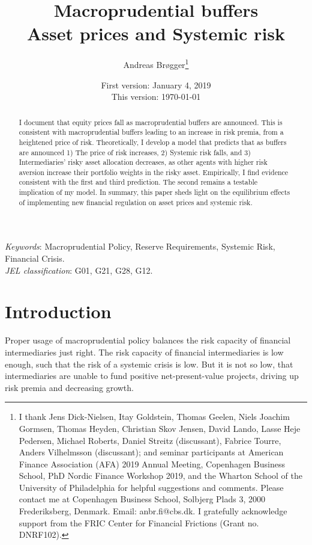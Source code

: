\documentclass[11pt]{article}
\title{\Huge Macroprudential buffers\\ \huge{Asset prices and Systemic risk}}
\author{\Large Andreas Br\o gger\thanks{
\small
I thank Jens Dick-Nielsen, Itay Goldstein, Thomas Geelen, Niels Joachim Gormsen, Thomas Heyden, Christian Skov Jensen, David Lando, Lasse Heje Pedersen, Michael Roberts, Daniel Streitz (discussant), Fabrice Tourre, Anders Vilhelmsson (discussant); and seminar participants at American Finance Association (AFA) 2019 Annual Meeting, Copenhagen Business School, PhD Nordic Finance Workshop 2019, and the Wharton School of the University of Philadelphia for helpful suggestions and comments. Please contact me at Copenhagen Business School, Solbjerg Plads 3, 2000 Frederiksberg, Denmark.
Email: anbr.fi@cbs.dk.
I gratefully acknowledge support from the FRIC Center for Financial Frictions (Grant no. DNRF102).}
}
\date{\Large First version: January 4, 2019\\This version: \today
}
\begin{document}
\maketitle

\begin{abstract}
\noindent I document that equity prices fall as macroprudential buffers are announced. This is consistent with macroprudential buffers leading to an increase in risk premia, from a heightened price of risk. Theoretically, I develop a model that predicts that as buffers are announced 1) The price of risk increases, 2) Systemic risk falls, and 3) Intermediaries' risky asset allocation decreases, as other agents with higher risk aversion increase their portfolio weights in the risky asset. Empirically, I find evidence consistent with the first and third prediction. The second remains a testable implication of my model. In summary, this paper sheds light on the equilibrium effects of implementing new financial regulation on asset prices and systemic risk.
\end{abstract}

\noindent \textit{Keywords}: Macroprudential Policy, Reserve Requirements, Systemic Risk, Financial Crisis.\\
\noindent \textit{JEL classification}: G01, G21, G28, G12.

\clearpage
\renewcommand{\thefootnote}{\arabic{footnote}}


\section*{Introduction}
Proper usage of macroprudential policy balances the risk capacity of financial intermediaries just right. The risk capacity of financial intermediaries is low enough, such that the risk of a systemic crisis is low. But it is not so low, that intermediaries are unable to fund positive net-present-value projects, driving up risk premia and decreasing growth.
\end{document}
